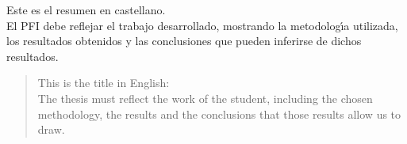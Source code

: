 \begin{resumen}%
Este es el resumen en castellano.\\
El PFI debe reflejar el trabajo desarrollado, mostrando la metodolog\'{\i}a utilizada, los resultados obtenidos y las conclusiones que pueden inferirse de dichos resultados.
\end{resumen}

\begin{abstract}%
This is the title in English:\\
The thesis must reflect the work of the student, including the chosen methodology, the results and the conclusions that those results allow us to draw.
\end{abstract}


